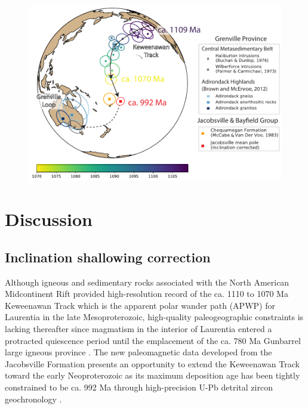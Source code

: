 \documentclass[draft]{agujournal2019}
\begin{document}
\begin{figure}[h!]
\centering
\includegraphics[width=\textwidth]{Jacobsville_pole_plot.pdf}
\caption{}
\label{fig:pole_plot}
\end{figure}



\section*{Discussion}
\subsection*{Inclination shallowing correction}

Although igneous and sedimentary rocks associated with the North American Midcontinent Rift provided high-resolution record of the ca. 1110 to 1070 Ma Keweenawan Track which is the apparent polar wander path (APWP) for Laurentia in the late Mesoproterozoic, high-quality paleogeographic constraints is lacking thereafter since magmatism in the interior of Laurentia entered a protracted quiescence period until the emplacement of the ca. 780 Ma Gunbarrel large igneous province \cite{Harlan2003a}. The new paleomagnetic data developed from the Jacobsville Formation presents an opportunity to extend the Keweenawan Track toward the early Neoproterozoic as its maximum deposition age has been tightly constrained to be ca. 992 Ma through high-precision U-Pb detrital zircon geochronology \cite{Hodgin2022a}. 
\end{document}
